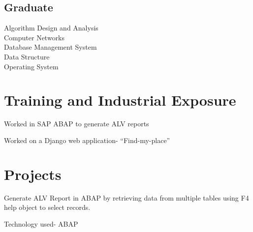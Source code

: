 \documentclass[]{resume-openfont}
\begin{document}
\begin{minipage}[t]{0.33\textwidth}
\subsection{Graduate}
Algorithm Design and Analysis \\
Computer Networks \\
Database Management System \\
Data Structure \\
Operating System \\
\sectionsep

%
%

\end{minipage} 
\hfill
\begin{minipage}[t]{0.66\textwidth} 


\section{Training and Industrial Exposure}

\vspace{\topsep} %
\begin{tightemize}\item Worked in SAP ABAP to generate ALV reports
\end{tightemize}

\sectionsep

\begin{tightemize}\item Worked on a Django web application- “Find-my-place”
\end{tightemize}

\sectionsep


\section{Projects}

Generate ALV Report in ABAP by retrieving data from multiple tables using F4 help object to select records. \\
\begin{tightemize}
\item Technology used- ABAP
\end{tightemize}
\sectionsep


\end{minipage}
\end{document}

